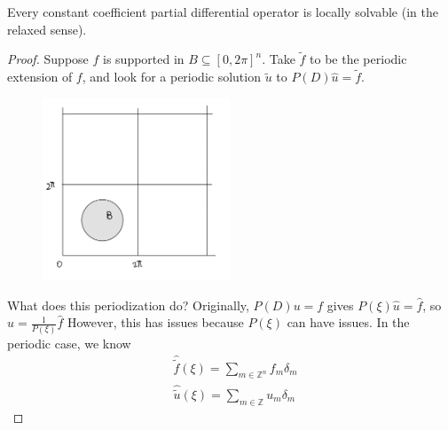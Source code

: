 \begin{theorem}
    Every constant coefficient partial differential operator is locally solvable (in the relaxed sense).
\end{theorem}
\begin{proof}
    Suppose $f$ is supported in $B \subseteq[0,2 \pi]^{n} .$ Take $\widetilde{f}$ to be the periodic extension of $f$, and look for a periodic solution $\widetilde{u}$ to $P(D) \widehat{u}=\widetilde{f}$.
    \begin{figure}[H]
        \centering
        \includegraphics[width=0.5\textwidth]{pics/21-1.png}
    \end{figure}
    What does this periodization do? Originally, $P(D) u=f$ gives $P(\xi) \widehat{u}=\widehat{f}$, so $\widehat{u}=\frac{1}{P(\xi)} \widehat{f}$ However, this has issues because $P(\xi)$ can have issues. In the periodic case, we know
$$
\begin{aligned}
&\widehat{\widetilde{f}}(\xi)=\sum_{m \in \mathbb{Z}^{n}} f_{m} \delta_{m} \\
&\widehat{\widetilde{u}}(\xi)=\sum_{m \in \mathbb{Z}} u_{m} \delta_{m}
\end{aligned}
$$


\end{proof}

